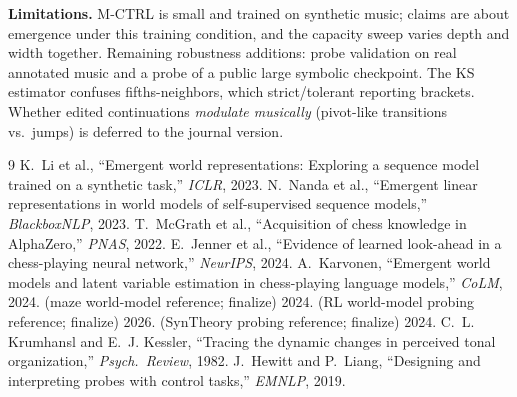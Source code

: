 \documentclass[conference]{IEEEtran}
\begin{document}
\textbf{Limitations.} M-CTRL is small and trained on synthetic music; claims
are about emergence under this training condition, and the capacity sweep
varies depth and width together. Remaining robustness additions: probe
validation on real annotated music and a probe of a public large symbolic
checkpoint. The KS estimator confuses fifths-neighbors, which strict/tolerant
reporting brackets. Whether edited continuations \emph{modulate musically}
(pivot-like transitions vs.\ jumps) is deferred to the journal version.

\begin{thebibliography}{9}\small
{} K.~Li et al., ``Emergent world representations:
Exploring a sequence model trained on a synthetic task,'' \emph{ICLR}, 2023.
 N.~Nanda et al., ``Emergent linear
representations in world models of self-supervised sequence models,''
\emph{BlackboxNLP}, 2023.
 T.~McGrath et al., ``Acquisition of chess
knowledge in AlphaZero,'' \emph{PNAS}, 2022.
 E.~Jenner et al., ``Evidence of learned look-ahead
in a chess-playing neural network,'' \emph{NeurIPS}, 2024.
 A.~Karvonen, ``Emergent world models and latent
variable estimation in chess-playing language models,'' \emph{CoLM}, 2024.
 (maze world-model reference; finalize) 2024.
 (RL world-model probing reference; finalize) 2026.
 (SynTheory probing reference; finalize) 2024.
 C.~L. Krumhansl and E.~J. Kessler, ``Tracing the
dynamic changes in perceived tonal organization,'' \emph{Psych.\ Review},
1982.
 J.~Hewitt and P.~Liang, ``Designing and
interpreting probes with control tasks,'' \emph{EMNLP}, 2019.
\end{thebibliography}
\end{document}
